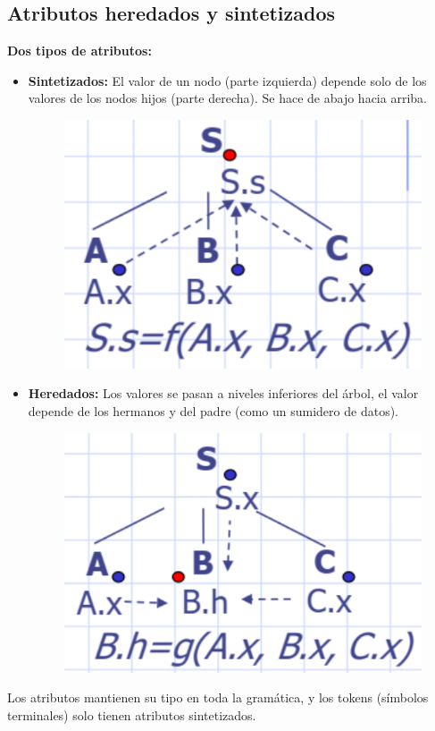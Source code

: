 \documentclass[12pt, twoside, openright]{report} %
\begin{document}
\subsection{Atributos heredados y sintetizados}
\textbf{Dos tipos de atributos:}
\begin{itemize}
  \item \textbf{Sintetizados:} El valor de un nodo (parte izquierda) depende solo de los valores de los nodos hijos (parte derecha). Se hace de abajo hacia arriba.
  \begin{figure}[H]
    {\includegraphics[scale=.3]{2021-04-21 10_46_33-05_resum_Sem_2021.pdf - Foxit Reader.png}}
  \end{figure}

  \item \textbf{Heredados:} Los valores se pasan a niveles inferiores del árbol, el valor depende de los hermanos y del padre (como un sumidero de datos).
  
  \begin{figure}[H]
    {\includegraphics[scale=.3]{2021-04-21 10_47_58-05_resum_Sem_2021.pdf - Foxit Reader.png}}
  \end{figure}

\end{itemize}
Los atributos mantienen su tipo en toda la gramática, y los tokens (símbolos terminales) solo tienen atributos sintetizados.
\end{document}
